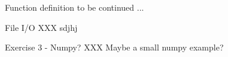 \documentclass[11pt,unknownkeysallowed,usenames,dvipsnames]{beamer}
\begin{document}
\begin{frame}{Function definition}
    \pythonCode
    to be continued ...
    
\end{frame}
   

	\begin{frame}{File I/O}
		XXX sdjhj
	\end{frame}

	\begin{frame}{Exercise 3 - Numpy?}
		XXX Maybe a small numpy example?
	\end{frame}
\end{document}
